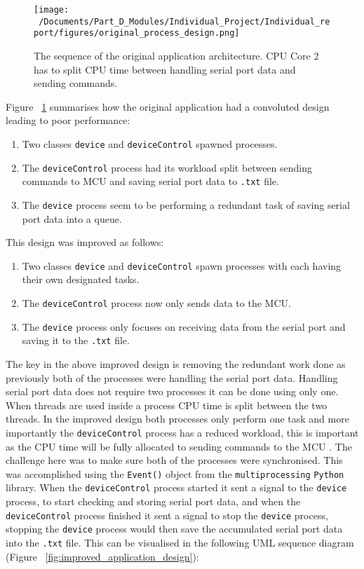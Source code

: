 \begin{figure}[htbp] %
	\centering
	\texttt{[image: ~/Documents/Part\_D\_Modules/Individual\_Project/Individual\_report/figures/original\_process\_design.png]} %
	\caption{The sequence of the original application architecture. CPU Core 2 has to split CPU time between handling serial port data and sending commands.}
	\label{fig:original_application_arch} %
\end{figure}

Figure ~\ref{fig:original_application_arch} summarises how the original application had a convoluted design leading to poor performance:

\begin{enumerate}
	\item Two classes \texttt{device} and \texttt{deviceControl} spawned processes. 
	\item The \texttt{deviceControl} process had its workload split between sending commands to MCU and saving serial port data to \texttt{.txt} file.  
	\item The \texttt{device} process seem to be performing a redundant task of saving serial port data into a queue. 
\end{enumerate}

This design was improved as follows:

\begin{enumerate}
	\item Two classes \texttt{device} and \texttt{deviceControl} spawn processes with each having their own designated tasks.
	\item The \texttt{deviceControl} process now only sends data to the MCU.   
	\item The \texttt{device} process only focuses on receiving data from the serial port and saving it to the \texttt{.txt} file. 
\end{enumerate}

The key in the above improved design is removing the redundant work done as previously both of the processes were handling the serial port data. Handling serial port data does not require two processes it can be done using only one. When threads are used inside a process CPU time is split between the two threads. In the improved design both processes only perform one task and more importantly the \texttt{deviceControl} process has a reduced workload, this is important as the CPU time will be fully allocated to sending commands to the MCU . The challenge here was to make sure both of the processes were synchronised. This was accomplished using the \texttt{Event()} object from the \texttt{multiprocessing} \texttt{Python} library. When the \texttt{deviceControl} process started it sent a signal to the \texttt{device} process, to start checking and storing serial port data, and when the \texttt{deviceControl} process finished it sent a signal to stop the \texttt{device} process, stopping the \texttt{device} process would then save the accumulated serial port data into the \texttt{.txt} file. This can be visualised in the following UML sequence diagram (Figure ~\ref{fig:improved_application_design}):

